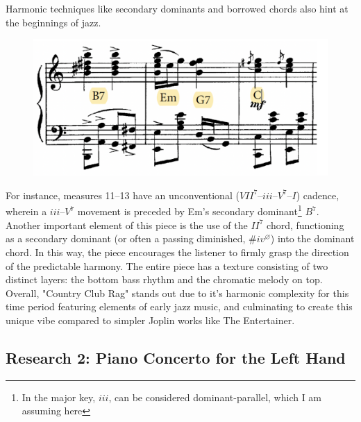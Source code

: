 \documentclass[12pt]{article}
\begin{document}
Harmonic techniques like secondary dominants and borrowed chords also hint at the beginnings of jazz. 
\begin{figure}[H]
\begin{center}
\includegraphics[width=0.4\linewidth]{joplin3}
\end{center}
\end{figure}
For instance, measures 11–13 have an unconventional ($VII^7–iii–V^7–I$) cadence, wherein a $iii–V^7$ movement is preceded by Em's secondary dominant\footnote{In the major key, $iii$, can be considered dominant-parallel, which I am assuming here} $B^7$. Another important element of this piece is the use of the $II^7$ chord, functioning as a secondary dominant (or often a passing diminished, $\# iv^{\varnothing}$) into the dominant chord. In this way, the piece encourages the listener to firmly grasp the direction of the predictable harmony. The entire piece has a texture consisting of two distinct layers: the bottom bass rhythm and the chromatic melody on top. Overall, "Country Club Rag" stands out due to it's harmonic complexity for this time period featuring elements of early jazz music, and culminating to create this unique vibe compared to simpler Joplin works like The Entertainer.


\subsection{Research 2: Piano Concerto for the Left Hand}
\end{document}
